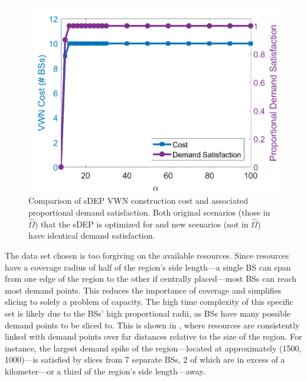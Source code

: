 \documentclass[12pt,dvipsnames]{report}
\begin{document}
\begin{figure}[htp]
	\centering
	\includegraphics[height=0.4\textheight]{Figures/CaseI_sDEPComparisonCostSat}
	\caption[Comparison of sDEP approach costs and demand satisfaction for Case I simulations]{Comparison of sDEP VWN construction cost and associated proportional demand satisfaction.  Both original scenarios (those in $\hat{\Omega}$) that the sDEP is optimized for and new scenarios (not in $\hat{\Omega}$) have identical demand satisfaction.}
	\label{fig:CaseI_sDEPComparisonCostSat}
\end{figure}

The data set chosen is too forgiving on the available resources.  Since resources have a coverage radius of half of the region's side length---a single BS can span from one edge of the region to the other if centrally placed---most BSs can reach most demand points.  This reduces the importance of coverage and simplifies slicing to solely a problem of capacity.  The high time complexity of this specific set is likely due to the BSs' high proportional radii, as BSs have many possible demand points to be sliced to.  This is shown in , where resources are consistently linked with demand points over far distances relative to the size of the region.  For instance, the largest demand spike of the region---located at approximately (1500, 1000)---is satisfied by slices from 7 separate BSs, 2 of which are in excess of a kilometer---or a third of the region's side length---away.
\end{document}
